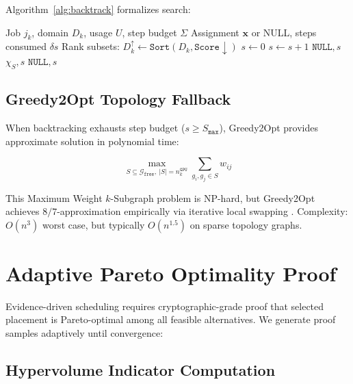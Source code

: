\documentclass[11pt, twoside]{article}
\begin{document}
Algorithm~\ref{alg:backtrack} formalizes search:

\begin{algorithm}[h]
\caption{Bandwidth-Oriented Backtracking Search}
\label{alg:backtrack}
\begin{algorithmic}[1]
\Require Job $j_k$, domain $D_k$, usage $U$, step budget $\Sigma$
\Ensure Assignment $\mathbf{x}$ or NULL, steps consumed $\delta s$
\State Rank subsets: $D_k^\uparrow \gets \texttt{Sort}(D_k, \texttt{Score} \downarrow)$
\State $s \gets 0$
    \State $s \gets s + 1$
     \Return $\texttt{NULL}, s$ \EndIf
     \Return $\chi_S, s$ 
    \EndIf
\EndFor
\Return $\texttt{NULL}, s$
\end{algorithmic}
\end{algorithm}

\subsection{Greedy2Opt Topology Fallback}

When backtracking exhausts step budget ($s \geq S_{\texttt{max}}$), Greedy2Opt provides approximate solution in polynomial time:

\begin{equation}
\max_{S \subseteq \mathcal{G}_{\texttt{free}},\ |S|=n_k^{\texttt{GPU}}} \sum_{g_i,g_j \in S} w_{ij}
\label{eq:k_subgraph_problem}
\end{equation}

This Maximum Weight $k$-Subgraph problem is NP-hard, but Greedy2Opt achieves $8/7$-approximation empirically via iterative local swapping \cite{bafna2021}. Complexity: $O(n^3)$ worst case, but typically $O(n^{1.5})$ on sparse topology graphs.

\section{Adaptive Pareto Optimality Proof}

Evidence-driven scheduling requires cryptographic-grade proof that selected placement is Pareto-optimal among all feasible alternatives. We generate proof samples adaptively until convergence:

\subsection{Hypervolume Indicator Computation}
\end{document}
